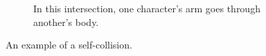 \begin{figure}[h!]
\begin{subfigure}[b!]{0.45\textwidth}
                \label{fig:self1}
                \caption{In this intersection, one character's arm goes through another's body.}
        \end{subfigure}%
        \caption{An example of a self-collision.}
	\label{fig:selfcollisions}
\end{figure}